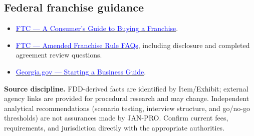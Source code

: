 \documentclass[10pt,letterpaper]{article}
\newcommand{\Link}[2]{\href{#1}{\textcolor{Blue}{#2}}}
\begin{document}
\subsection{Federal franchise guidance}
\begin{itemize}
\item \Link{https://www.ftc.gov/business-guidance/resources/consumers-guide-buying-franchise}{FTC --- A Consumer's Guide to Buying a Franchise}.
\item \Link{https://www.ftc.gov/business-guidance/resources/amended-franchise-rule-faqs}{FTC --- Amended Franchise Rule FAQs}, including disclosure and completed agreement review questions.
\item \Link{https://georgia.gov/starting-business-guide}{Georgia.gov --- Starting a Business Guide}.
\end{itemize}

\begin{noteBox}
\textbf{Source discipline.} FDD-derived facts are identified by Item/Exhibit;
external agency links are provided for procedural research and may change.
Independent analytical recommendations (scenario testing, interview structure,
and go/no-go thresholds) are not assurances made by JAN-PRO. Confirm current
fees, requirements, and jurisdiction directly with the appropriate authorities.
\end{noteBox}

\clearpage
\end{document}
